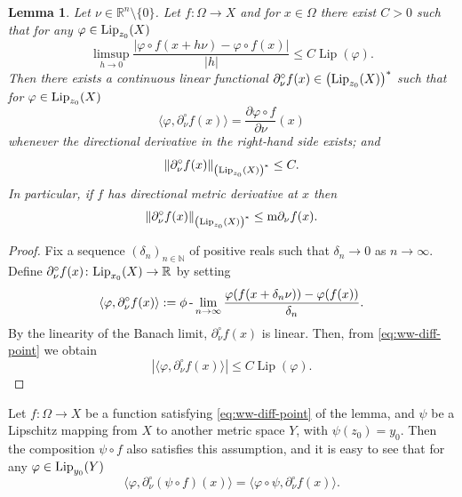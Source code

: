 \documentclass[reqno]{amsart}
\newtheorem{lem}[thm]{Lemma}
\begin{document}
\begin{lem}\label{lemma:lip-derivative}
Let $\nu \in \mathbb R^{n}\setminus\{0\}$. Let $f:\Omega\to X$ and for $x\in\Omega$ there exist $C>0$ such that for any $\varphi\in \textnormal{Lip}_{z_0}(X)$
\begin{equation}\label{eq:ww-diff-point}
\limsup_{h\to 0} \frac{|\varphi\circ f(x + h\nu) - \varphi\circ f(x) |}{|h|} \leq C \operatorname{Lip}(\varphi).
\end{equation}
Then there exists a continuous linear functional $\partial^\circ_\nu f(x)\in\left(\textnormal{Lip}_{z_0}(X)\right)^*$
such that
for $\varphi\in \textnormal{Lip}_{z_0}(X)$
\begin{equation*}
\langle \varphi, \partial^\circ_\nu f(x) \rangle = \frac{\partial\varphi\circ f}{\partial\nu}(x)
\end{equation*}
whenever the directional derivative in the right-hand side exists;
and
\[
\| \partial^\circ_\nu f(x) \|_{\left(\textnormal{Lip}_{z_0}(X)\right)^*} \leq C.
\]
In particular, if $f$ has directional metric derivative at $x$ then 
$$
\| \partial^\circ_\nu f(x) \|_{\left(\textnormal{Lip}_{z_0}(X)\right)^*} \leq  \textnormal{m}\partial_\nu f(x).
$$
\end{lem}
\begin{proof}
Fix a sequence $(\delta_n)_{n\in\mathbb N}$ of positive reals such that $\delta_n\to 0$ as $n\to \infty$. 
Define $\partial^\circ_\nu f(x)\colon \textnormal{Lip}_{x_0}(X)\to \mathbb{R}$ by setting
    \begin{equation}
    \langle \varphi, \partial^\circ_\nu f(x) \rangle := 
\phi\text{\,-}\lim\limits_{n\to\infty} \frac{\varphi(f(x+\delta_n \nu)) -\varphi(f(x))}{\delta_n}.
    \end{equation} 
By the linearity of the Banach limit,  $\partial^\circ_\nu f(x)$ is linear.
    Then, from \eqref{eq:ww-diff-point}  we obtain 
\begin{equation*}
|\langle \varphi, \partial^\circ_\nu f(x) \rangle | \leq C \operatorname{Lip}(\varphi).
\end{equation*}
\end{proof}

Let $f:\Omega\to X$ be a function satisfying \eqref{eq:ww-diff-point} of the lemma, and $\psi$ be a Lipschitz mapping from $X$ to another metric space $Y$, with $\psi(z_0) = y_0$.
Then the composition $\psi\circ f$ also satisfies this assumption, and it is easy to see that for any $\varphi\in \textnormal{Lip}_{y_0}(Y)$
\begin{equation}\label{eq:comisometric}
  \langle \varphi, \partial^\circ_\nu (\psi\circ f)(x) \rangle =   \langle \varphi\circ\psi, \partial^\circ_\nu f(x) \rangle.
\end{equation}
\end{document}
